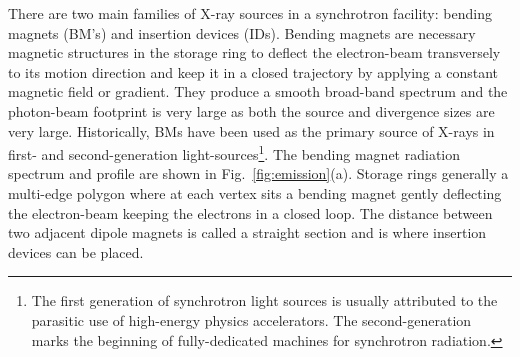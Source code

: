 \begin{refsection}
There are two main families of X-ray sources in a synchrotron facility: bending magnets (BM's) and insertion devices (IDs). Bending magnets are necessary magnetic structures in the storage ring to deflect the electron-beam transversely to its motion direction and keep it in a closed trajectory by applying a constant magnetic field or gradient. They produce a smooth broad-band spectrum and the photon-beam footprint is very large as both the source and divergence sizes are very large. Historically, BMs have been used as the primary source of X-rays in first- and second-generation light-sources\footnote{The first generation of synchrotron light sources is usually attributed to the parasitic use of high-energy physics accelerators. The second-generation marks the beginning of fully-dedicated machines for synchrotron radiation.}. The bending magnet radiation spectrum and profile are shown in Fig.~\ref{fig:emission}(a). Storage rings generally a multi-edge polygon where at each vertex sits a bending magnet gently deflecting the electron-beam keeping the electrons in a closed loop. The distance between two adjacent dipole magnets is called a straight section and is where insertion devices can be placed.


\end{refsection}
